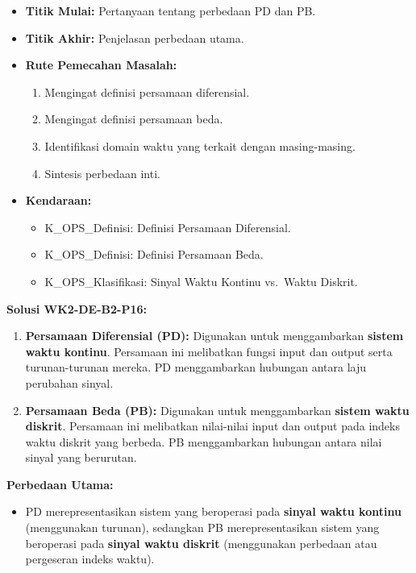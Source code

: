 \documentclass[
  letterpaper,
  DIV=11,
  numbers=noendperiod]{scrreprt}
\providecommand{\tightlist}{%
  \setlength{\itemsep}{0pt}\setlength{\parskip}{0pt}}
\begin{document}
\begin{itemize}
\tightlist
\item
  \textbf{Titik Mulai:} Pertanyaan tentang perbedaan PD dan PB.
\item
  \textbf{Titik Akhir:} Penjelasan perbedaan utama.
\item
  \textbf{Rute Pemecahan Masalah:}

  \begin{enumerate}
  \def\labelenumi{\arabic{enumi}.}
  \tightlist
  \item
    Mengingat definisi persamaan diferensial.
  \item
    Mengingat definisi persamaan beda.
  \item
    Identifikasi domain waktu yang terkait dengan masing-masing.
  \item
    Sintesis perbedaan inti.
  \end{enumerate}
\item
  \textbf{Kendaraan:}

  \begin{itemize}
  \tightlist
  \item
    K\_OPS\_Definisi: Definisi Persamaan Diferensial.
  \item
    K\_OPS\_Definisi: Definisi Persamaan Beda.
  \item
    K\_OPS\_Klasifikasi: Sinyal Waktu Kontinu vs.~Waktu Diskrit.
  \end{itemize}
\end{itemize}

\textbf{Solusi WK2-DE-B2-P16:}

\begin{enumerate}
\def\labelenumi{\arabic{enumi}.}
\tightlist
\item
  \textbf{Persamaan Diferensial (PD):} Digunakan untuk menggambarkan
  \textbf{sistem waktu kontinu}. Persamaan ini melibatkan fungsi input
  dan output serta turunan-turunan mereka. PD menggambarkan hubungan
  antara laju perubahan sinyal.
\item
  \textbf{Persamaan Beda (PB):} Digunakan untuk menggambarkan
  \textbf{sistem waktu diskrit}. Persamaan ini melibatkan nilai-nilai
  input dan output pada indeks waktu diskrit yang berbeda. PB
  menggambarkan hubungan antara nilai sinyal yang berurutan.
\end{enumerate}

\textbf{Perbedaan Utama:}

\begin{itemize}
\tightlist
\item
  PD merepresentasikan sistem yang beroperasi pada \textbf{sinyal waktu
  kontinu} (menggunakan turunan), sedangkan PB merepresentasikan sistem
  yang beroperasi pada \textbf{sinyal waktu diskrit} (menggunakan
  perbedaan atau pergeseran indeks waktu).
\end{itemize}
\end{document}
